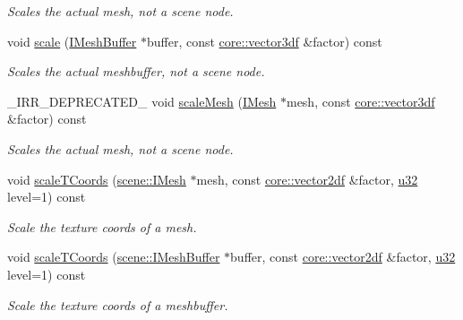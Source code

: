 \begin{DoxyCompactItemize}
\begin{DoxyCompactList}\small\item\em Scales the actual mesh, not a scene node. \end{DoxyCompactList}\item 
void \hyperlink{classirr_1_1scene_1_1IMeshManipulator_a6aa8b1bd153c7e524e8200988078282f}{scale} (\hyperlink{classirr_1_1scene_1_1IMeshBuffer}{I\+Mesh\+Buffer} $\ast$buffer, const \hyperlink{namespaceirr_1_1core_ae6e2b2a6c552833ebbd5b7463d03586b}{core\+::vector3df} \&factor) const
\begin{DoxyCompactList}\small\item\em Scales the actual meshbuffer, not a scene node. \end{DoxyCompactList}\item 
\+\_\+\+I\+R\+R\+\_\+\+D\+E\+P\+R\+E\+C\+A\+T\+E\+D\+\_\+ void \hyperlink{classirr_1_1scene_1_1IMeshManipulator_a00f8ef80adfd5bb15644b64e8cd9f55e}{scale\+Mesh} (\hyperlink{classirr_1_1scene_1_1IMesh}{I\+Mesh} $\ast$mesh, const \hyperlink{namespaceirr_1_1core_ae6e2b2a6c552833ebbd5b7463d03586b}{core\+::vector3df} \&factor) const
\begin{DoxyCompactList}\small\item\em Scales the actual mesh, not a scene node. \end{DoxyCompactList}\item 
void \hyperlink{classirr_1_1scene_1_1IMeshManipulator_a2bc907891c8db77eebcad387ae3b31c3}{scale\+T\+Coords} (\hyperlink{classirr_1_1scene_1_1IMesh}{scene\+::\+I\+Mesh} $\ast$mesh, const \hyperlink{namespaceirr_1_1core_a116f90bd31515724b6235014ee2b74d5}{core\+::vector2df} \&factor, \hyperlink{namespaceirr_a0416a53257075833e7002efd0a18e804}{u32} level=1) const
\begin{DoxyCompactList}\small\item\em Scale the texture coords of a mesh. \end{DoxyCompactList}\item 
void \hyperlink{classirr_1_1scene_1_1IMeshManipulator_ad9e58b8382ab8d7a84b2383590f6d147}{scale\+T\+Coords} (\hyperlink{classirr_1_1scene_1_1IMeshBuffer}{scene\+::\+I\+Mesh\+Buffer} $\ast$buffer, const \hyperlink{namespaceirr_1_1core_a116f90bd31515724b6235014ee2b74d5}{core\+::vector2df} \&factor, \hyperlink{namespaceirr_a0416a53257075833e7002efd0a18e804}{u32} level=1) const
\begin{DoxyCompactList}\small\item\em Scale the texture coords of a meshbuffer. \end{DoxyCompactList}\item 

\end{DoxyCompactItemize}
